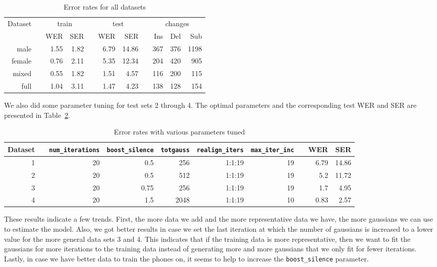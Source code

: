 \documentclass[11pt]{article}
\begin{document}
\begin{table}\centering
  \begin{tabular}{@{}rcrrcrrcrrr@{}}\toprule%
    \multirow{2}{*}{Dataset} & \phantom{a} & \multicolumn{2}{c}{train}
    & \phantom{a} & \multicolumn{2}{c}{test} & \phantom{a}
    & \multicolumn{3}{c}{changes}\\
    \cmidrule{3-4} \cmidrule{6-7} \cmidrule{9-11}
    && WER & SER && WER & SER && Ins & Del & Sub\\ \midrule%
    male && 1.55 & 1.82 && 6.79 & 14.86 && 367 & 376 & 1198\\
    female && 0.76 & 2.11 && 5.35 & 12.34 && 204 & 420 & 905\\
    mixed && 0.55 & 1.82 && 1.51 & 4.57 && 116 & 200 & 115\\
    full && 1.04 & 3.11 && 1.47 & 4.23 && 138 & 128 & 154\\
    \bottomrule
  \end{tabular}
  \caption{Error rates for all datasets}\label{tab:wer-all}
\end{table}

We also did some parameter tuning for test sets 2 through 4. The optimal
parameters and the corresponding test WER and SER are presented in
Table~\ref{tab:wer-param}.

\begin{table}\centering
  \begin{tabular}{@{}rcrrrrrcrr@{}}\toprule%
    Dataset & \phantom{a} & \texttt{num\_iterations} & \texttt{boost\_silence}
    & \texttt{totgauss} & \texttt{realign\_iters} & \texttt{max\_iter\_inc}
    & \phantom{a} & WER & SER\\ \midrule%
    1 && 20 & 0.5 & 256 & 1:1:19 & 19 && 6.79 & 14.86\\
    2 && 20 & 0.5 & 512 & 1:1:19 & 19 && 5.2 & 11.72\\
    3 && 20 & 0.75 & 256 & 1:1:19 & 19 && 1.7 & 4.95\\
    4 && 20 & 1.5 & 2048 & 1:1:19 & 10 && 0.83 & 2.57\\
  \end{tabular}
  \caption{Error rates with various parameters tuned}\label{tab:wer-param}
\end{table}

These results indicate a few trends. First, the more data we add and the more
representative data we have, the more gaussians we can use to estimate the
model. Also, we got better results in case we set the last iteration at which
the number of gaussians is increased to a lower value for the more general data
sets 3 and 4. This indicates that if the training data is more representative,
then we want to fit the gaussians for more iterations to the training data
instead of generating more and more gaussians that we only fit for fewer
iterations. Lastly, in case we have better data to train the phones on, it seems
to help to increase the \texttt{boost\_silence} parameter.
\end{document}
